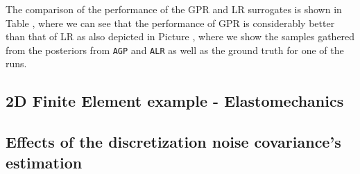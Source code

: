 The comparison of the performance of the GPR and LR surrogates is shown in Table , where we can see that the performance of GPR is considerably better than that of LR as also depicted in Picture , where we show the samples gathered from the posteriors from \texttt{AGP} and \texttt{ALR} as well as the ground truth for one of the runs.

\subsection{2D Finite Element example - Elastomechanics}\label{sec:FEexp}



\subsection{Effects of the discretization noise covariance's estimation}\label{sec:cov-est}



